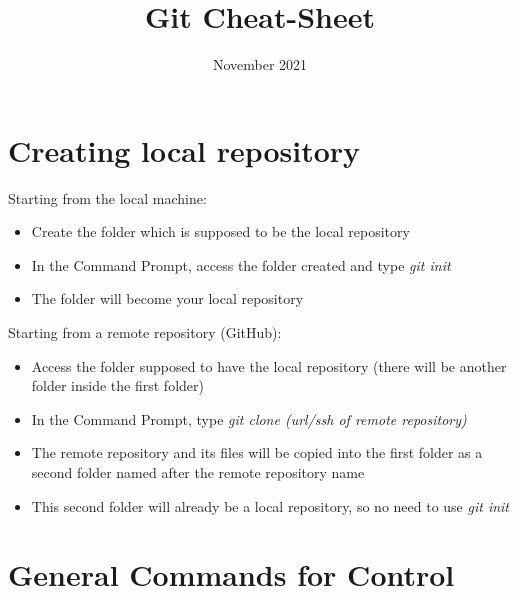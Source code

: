 \documentclass{article}
\title{Git Cheat-Sheet}
\date{November 2021}
\begin{document}
\maketitle


\section{Creating local repository}

Starting from the local machine:

\begin{itemize}
    \item Create the folder which is supposed to be the local repository
    \item In the Command Prompt, access the folder created and type \textit{git init}
    \item The folder will become your local repository
\end{itemize}

Starting from a remote repository (GitHub):

\begin{itemize}
    \item Access the folder supposed to have the local repository (there will be another folder inside the first folder)
    \item In the Command Prompt, type \textit{git clone (url/ssh of remote repository)}
    \item The remote repository and its files will be copied into the first folder as a second folder named after the remote repository name
    \item This second folder will already be a local repository, so no need to use \textit{git init}
\end{itemize}

\section{General Commands for Control}
\end{document}
